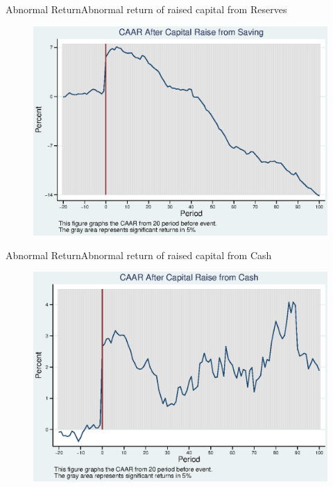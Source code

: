 \documentclass{beamer}
\begin{document}
\begin{frame}{Abnormal Return}{Abnormal return of raised capital from Reserves}
\label{abreturnsaving}
\begin{figure}
\centering
\includegraphics[width=0.65\linewidth]{Output/CARSaving.eps}
\label{fig:abreturnsaving}
\end{figure}

\hfill\hyperlink{abreturnsaving4Factor}{}
\end{frame}




\begin{frame}{Abnormal Return}{Abnormal return of raised capital from Cash}
\label{abreturncash}
\begin{figure}
\centering
\includegraphics[width=0.65\linewidth]{Output/CARCash.eps}
\label{fig:abreturncash}
\end{figure}
\hfill\hyperlink{abreturncash4Factor}{}
\end{frame}
\end{document}

